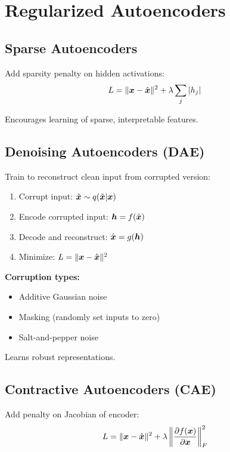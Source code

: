 
\section{Regularized Autoencoders }
\label{sec:regularized-ae}

\subsection{Sparse Autoencoders}

Add sparsity penalty on hidden activations:
\begin{equation}
L = \|\boldsymbol{x} - \hat{\boldsymbol{x}}\|^2 + \lambda \sum_j |h_j|
\end{equation}

Encourages learning of sparse, interpretable features.

\subsection{Denoising Autoencoders (DAE)}

Train to reconstruct clean input from corrupted version:
\begin{enumerate}
    \item Corrupt input: $\tilde{\boldsymbol{x}} \sim q(\tilde{\boldsymbol{x}}|\boldsymbol{x})$
    \item Encode corrupted input: $\boldsymbol{h} = f(\tilde{\boldsymbol{x}})$
    \item Decode and reconstruct: $\hat{\boldsymbol{x}} = g(\boldsymbol{h})$
    \item Minimize: $L = \|\boldsymbol{x} - \hat{\boldsymbol{x}}\|^2$
\end{enumerate}

\textbf{Corruption types:}
\begin{itemize}
    \item Additive Gaussian noise
    \item Masking (randomly set inputs to zero)
    \item Salt-and-pepper noise
\end{itemize}

Learns robust representations.

\subsection{Contractive Autoencoders (CAE)}

Add penalty on Jacobian of encoder:
\begin{equation}
L = \|\boldsymbol{x} - \hat{\boldsymbol{x}}\|^2 + \lambda \left\|\frac{\partial f(\boldsymbol{x})}{\partial \boldsymbol{x}}\right\|_F^2
\end{equation}

